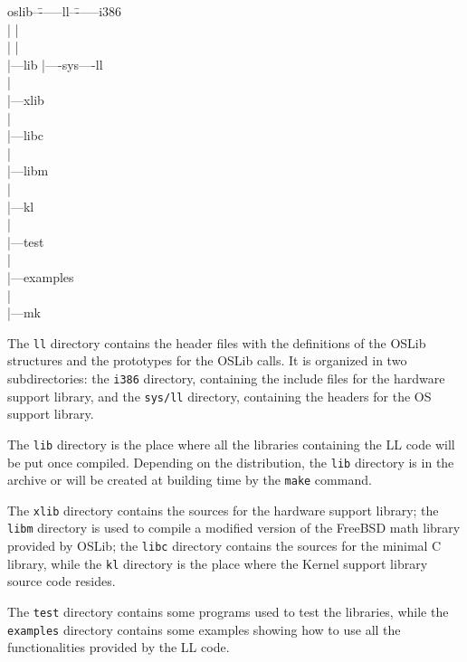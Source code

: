 \documentclass[a4paper]{report}
\begin{document}
\begin{minipage}[t]{10cm}
\begin{tt}
\begin{tabbing}
oslib--\=------ll--\=------i386		\\
\>	| \>		|			\\
\>	| \>		|			\\
\>	|---lib	\>	|----sys----ll		\\
\>	|					\\
\>	|---xlib \>				\\
\>	| \>					\\
\>	|---libc \>				\\
\>	| \>					\\
\>	|---libm \>				\\
\>	|					\\
\>	|---kl					\\
\>	|					\\
\>	|---test				\\
\>	|					\\
\>	|---examples				\\
\>	|					\\
\>	|---mk					\\
\end{tabbing}
\end{tt}
\end{minipage}

The {\tt ll} directory contains the header files with the
definitions of the OSLib structures and the prototypes for the OSLib calls.
It is organized in two subdirectories: the {\tt i386} directory,
containing the include files for the hardware support library, and
the {\tt sys/ll} directory, containing the headers for the OS support
library.

The {\tt lib} directory is the place where all the libraries
containing the LL code will be put once compiled. Depending on the
distribution, the {\tt lib} directory is in the archive or will be
created at building time by the {\tt make} command.

The {\tt xlib} directory contains the sources for the hardware
support  library; the {\tt libm} directory is used to compile a
modified version of the FreeBSD math library provided by OSLib; the 
{\tt libc} directory contains the sources for the minimal C library, 
while the {\tt kl} directory is the place where the Kernel support library
source code resides.

The {\tt test} directory contains some programs used to test the
libraries, while the {\tt examples} directory contains some examples
showing how to use all the functionalities provided by the LL code.
\end{document}
